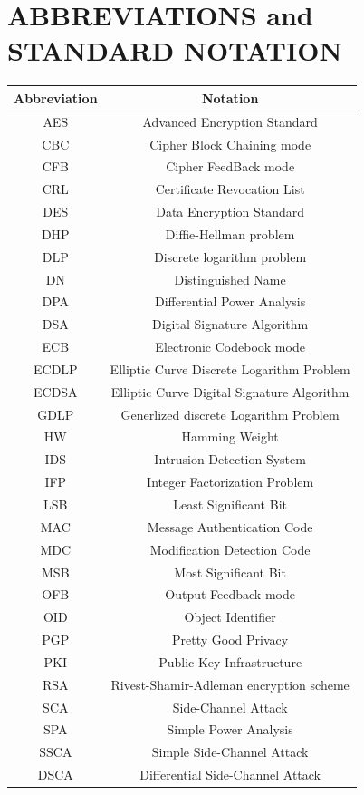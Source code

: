 \documentclass[a4paper, 10 pt, conference]{ieeeconf}
\begin{document}
\section{ABBREVIATIONS and STANDARD NOTATION}
\begin{table}[h!]
    \begin{center}
    \begin{tabularx}{\columnwidth}{c c} %
        \toprule
       Abbreviation & Notation \\
        \midrule
        AES & Advanced Encryption Standard \\
        CBC & Cipher Block Chaining mode \\
        CFB & Cipher FeedBack mode\\
        CRL & Certificate Revocation List\\
        DES & Data Encryption Standard \\
        DHP & Diffie-Hellman problem \\
        DLP & Discrete logarithm problem \\
        DN & Distinguished Name \\
        DPA & Differential Power Analysis \\
        DSA & Digital Signature Algorithm \\
        ECB & Electronic Codebook mode \\
        ECDLP & Elliptic Curve Discrete Logarithm Problem \\
        ECDSA & Elliptic Curve Digital Signature Algorithm \\
        GDLP & Generlized discrete Logarithm Problem \\
        HW & Hamming Weight \\
        IDS & Intrusion Detection System \\
        IFP & Integer Factorization Problem \\
        LSB & Least Significant Bit \\
        MAC & Message Authentication Code \\
        MDC & Modification Detection Code \\
        MSB & Most Significant Bit \\
        OFB & Output Feedback mode \\
        OID & Object Identifier \\
        PGP & Pretty Good Privacy \\
        PKI & Public Key Infrastructure \\
        RSA & Rivest-Shamir-Adleman encryption scheme \\
        SCA & Side-Channel Attack \\
        SPA & Simple Power Analysis \\
        SSCA & Simple Side-Channel Attack \\
        DSCA & Differential Side-Channel Attack \\
        \bottomrule
    \end{tabularx}
    \end{center}
\end{table}
\end{document}
